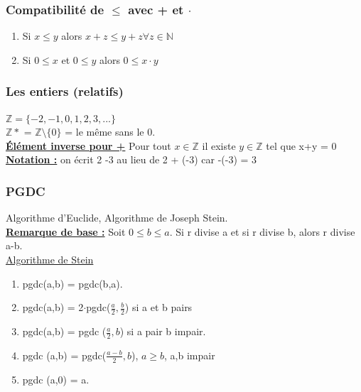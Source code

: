 \documentclass[12pt,a4paper]{article}
\newcommand{\evid}[1]{\textbf{\underline{#1}}}
\newcommand{\N}{\ensuremath{\mathbb{N}} }
\newcommand{\Z}{\ensuremath{\mathbb{Z}} }
\begin{document}
\subsubsection{Compatibilité de $\leq$ avec + et $\cdot$}
\begin{enumerate}%
\item Si $x \leq y$ alors $x+z \leq y + z \forall z \in \N$
\item Si $ 0 \leq x$ et $0 \leq y$ alors $0 \leq x \cdot y$ 
\end{enumerate}

\subsubsection{Les entiers (relatifs)}
$\mathbb{Z} = \{-2, -1, 0, 1, 2, 3,...\}$\\
$\mathbb{Z*}$ = $\Z \setminus \{0\}$ = le même sans le 0.\\
\evid{Élément inverse pour +} Pour tout $x \in \Z$ il existe $y \in \Z$ tel que x+y = 0\\
\evid{Notation :} on écrit 2 -3 au lieu de 2 + (-3) car -(-3) = 3

\subsubsection{PGDC}
Algorithme d'Euclide, Algorithme de Joseph Stein.\\
\evid{Remarque de base :} Soit $0 \leq b \leq a$. Si r divise a et si r divise b, alors r divise a-b.\\
\underline{Algorithme de Stein}
\begin{enumerate}
\item pgdc(a,b) = pgdc(b,a).
\item pgdc(a,b) = 2$\cdot$pgdc($\frac{a}{2}, \frac{b}{2}$) si a et b pairs
\item pgdc(a,b) = pgdc ($\frac{a}{2}, b$) si a pair b impair.
\item pgdc (a,b) = pgdc($\frac{a-b}{2}, b$), $a\geq b$, a,b impair
\item pgdc (a,0) = a.
\end{enumerate}
\end{document}
